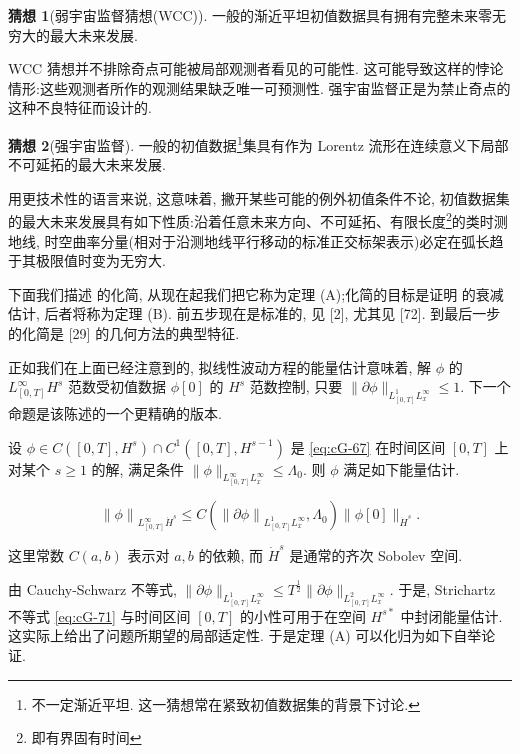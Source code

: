 \noindent\textbf{猜想 1}(弱宇宙监督猜想(WCC)). 一般的渐近平坦初值数据具有拥有完整未来零无穷大的最大未来发展. 

WCC 猜想并不排除奇点可能被局部观测者看见的可能性. 这可能导致这样的悖论情形:这些观测者所作的观测结果缺乏唯一可预测性. 强宇宙监督正是为禁止奇点的这种不良特征而设计的. 

\noindent\textbf{猜想 2}(强宇宙监督). 一般的初值数据\footnote{不一定渐近平坦. 这一猜想常在紧致初值数据集的背景下讨论. }集具有作为 Lorentz 流形在连续意义下局部不可延拓的最大未来发展. 

用更技术性的语言来说, 这意味着, 撇开某些可能的例外初值条件不论, 初值数据集的最大未来发展具有如下性质:沿着任意未来方向、不可延拓、有限长度\footnote{即有界固有时间}的类时测地线, 时空曲率分量(相对于沿测地线平行移动的标准正交标架表示)必定在弧长趋于其极限值时变为无穷大. 


下面我们描述  的化简, 从现在起我们把它称为定理 (A);化简的目标是证明  的衰减估计, 后者将称为定理 (B). 前五步现在是标准的, 见 {[}2{]}, 尤其见 {[}72{]}. 到最后一步的化简是 {[}29{]} 的几何方法的典型特征. 


正如我们在上面已经注意到的, 拟线性波动方程的能量估计意味着, 解 $\phi$ 的 $L_{[0, T]}^{\infty}H^{s}$ 范数受初值数据 $\phi[0]$ 的 $H^{s}$ 范数控制, 只要 $\|\partial\phi\|_{L_{[0, T]}^{1}L_{x}^{\infty}}\leq 1$. 下一个命题是该陈述的一个更精确的版本. 

\begin{proposition}[能量估计]\label{prop:cG-6.5}
设 $\phi \in C([0, T], H^s)\cap C^1([0, T], H^{s - 1})$ 是 \eqref{eq:cG-67} 在时间区间 $[0, T]$ 上对某个 $s\geq 1$ 的解, 满足条件 $\|\phi\|_{L_{[0, T]}^{\infty}L_x^\infty}\leq \Lambda_0$. 则 $\phi$ 满足如下能量估计. 

\begin{equation}
\left\|\phi\right\|_{L_{[0, T]}^{\infty}\dot{H}^{s}} \leq C\left(\left\|\partial\phi\right\|_{L_{[0, T]}^{1}L_{x}^{\infty}},  \Lambda_{0}\right)\|\phi[0]\|_{\dot{H}^{s}}.\label{eq:cG-122}
\end{equation}

这里常数 $C(a, b)$ 表示对 $a, b$ 的依赖, 而 $\dot{H}^s$ 是通常的齐次 Sobolev 空间. 
\end{proposition}


由 Cauchy-Schwarz 不等式, $\|\partial\phi\|_{L_{[0, T]}^1 L_x^\infty} \leq T^{\frac{1}{2}} \|\partial\phi\|_{L_{[0, T]}^2 L_x^\infty}$. 于是, Strichartz 不等式 \eqref{eq:cG-71} 与时间区间 $[0, T]$ 的小性可用于在空间 $H^{s*}$ 中封闭能量估计. 这实际上给出了问题所期望的局部适定性. 于是定理 (A) 可以化归为如下自举论证. 

